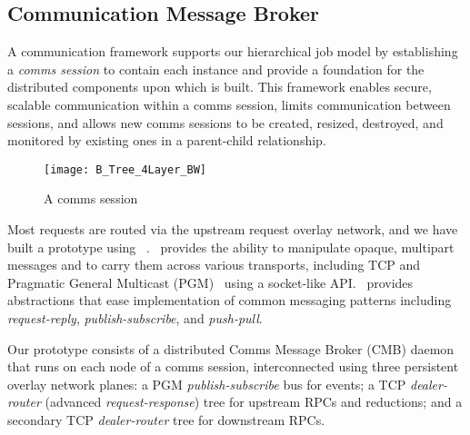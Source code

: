 \subsection{Communication Message Broker}

A communication framework supports our hierarchical job model
by establishing a {\em comms session} to contain each \flux instance
and provide a foundation for the distributed components upon which
\flux is built.
This framework enables secure, scalable communication
within a comms session, limits communication between sessions,
and allows new comms sessions to be created, resized, destroyed,
and monitored by existing ones in a parent-child relationship.

\begin{figure}
\centering
\texttt{[image: B\_Tree\_4Layer\_BW]}
\vspace{-.3cm}
\caption{A comms session} 
\vspace{-.5cm}
\label{fig:commswireup}
\end{figure}

Most requests are routed via the upstream request overlay network,
and we have built a prototype using \zMQ~\cite{ZMQGuide}. 
\zMQ\ provides the ability to manipulate opaque,
multipart messages and to carry them across various transports, including
TCP and Pragmatic General Multicast (PGM)~\cite{rfc3208}
using a socket-like API.
\zMQ\ provides abstractions that ease implementation of common
messaging patterns including {\em request-reply}, {\em publish-subscribe},
and {\em push-pull}.

Our prototype consists of a distributed Comms Message Broker (CMB)
daemon that runs on each node of a comms session, interconnected using
three persistent overlay network planes:
a PGM {\em publish-subscribe} bus for events; 
a TCP {\em dealer-router} (advanced {\em request-response})
tree for upstream RPCs and reductions; and
a secondary TCP {\em dealer-router} tree for downstream RPCs.


